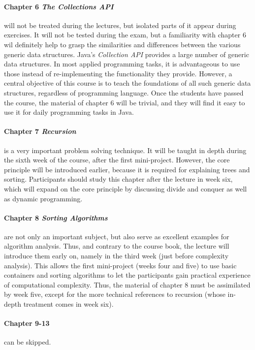 \documentclass[a4paper,twoculumn,10pt]{article}
\begin{document}
\paragraph{Chapter 6 \emph{The Collections API}} will not be treated during the lectures, but isolated parts of it appear during exercises.
It will not be tested during the exam, but a familiarity with chapter 6 wil definitely help to grasp the similarities and differences between the various generic data structures.
Java's \emph{Collection API} provides a large number of generic data structures.
In most applied programming tasks, it is advantageous to use those instead of re-implementing the functionality they provide.
However, a central objective of this course is to teach the foundations of all such generic data structures, regardless of programming language.
Once the students have passed the course, the material of chapter 6 will be trivial, and they will find it easy to use it for daily programming tasks in Java.

\paragraph{Chapter 7 \emph{Recursion}} is a very important problem solving technique.
It will be taught in depth during the sixth week of the course, after the first mini-project.
However, the core principle will be introduced earlier, because it is required for explaining trees and sorting.
Participants should study this chapter after the lecture in week six, which will expand on the core principle by discussing divide and conquer as well as dynamic programming.

\paragraph{Chapter 8 \emph{Sorting Algorithms}} are not only an important subject, but also serve as excellent examples for algorithm analysis.
Thus, and contrary to the course book, the lecture will introduce them early on, namely in the third week (just before complexity analysis).
This allows the first mini-project (weeks four and five) to use basic containers and sorting algorithms to let the participants gain practical experience of computational complexity.
Thus, the material of chapter 8 must be assimilated by week five, except for the more technical references to recursion (whose in-depth treatment comes in week six).

\paragraph{Chapter 9-13} can be skipped.
\end{document}
